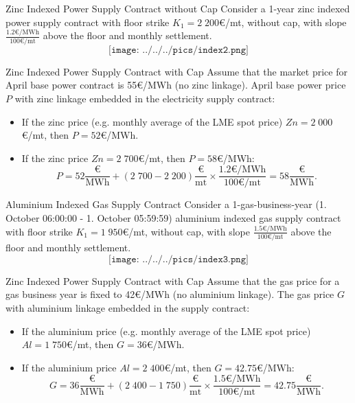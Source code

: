 {Zinc Indexed Power Supply Contract without Cap}
Consider a 1-year zinc indexed power supply contract with floor strike $K_1=2\;200$€/mt, without cap, with slope $\frac{1.2\text{€/MWh}}{100\text{€/mt}}$ above the floor and monthly settlement.
$$\texttt{[image: ../../../pics/index2.png]}$$

{Zinc Indexed Power Supply Contract with Cap}
Assume that the market price for April base power contract is \textcolor[rgb]{1.00,0.00,0.00}{55€/MWh} (no zinc linkage). April base power price $P$ with zinc linkage embedded in the electricity supply contract:
\vspace{0.4cm}
\begin{itemize}
  \item<2-> If the zinc price (e.g. monthly average of the LME spot price) $Zn=2\;000$€/mt, then \textcolor[rgb]{0.00,0.00,1.00}{$P=52$€/MWh}.
  \item<3-> If the zinc price $Zn=2\;700$€/mt, then \textcolor[rgb]{0.00,0.00,1.00}{$P=58$€/MWh}:
  $$P=52\frac{\text{€}}{\text{MWh}}+(2\;700-2\;200)\frac{\text{€}}{\text{mt}}\times\frac{1.2\text{€/MWh}}{100\text{€/mt}}=58\frac{\text{€}}{\text{MWh}}.$$
\end{itemize}

{Aluminium Indexed Gas Supply Contract}
Consider a 1-gas-business-year (1. October 06:00:00 - 1. October 05:59:59) aluminium indexed gas supply contract with floor strike $K_1=1\;950$€/mt, without cap, with slope $\frac{1.5\text{€/MWh}}{100\text{€/mt}}$ above the floor and monthly settlement.
$$\texttt{[image: ../../../pics/index3.png]}$$

{Zinc Indexed Power Supply Contract with Cap}
Assume that the gas price for a gas business year is fixed to \textcolor[rgb]{1.00,0.00,0.00}{42€/MWh} (no aluminium linkage). The gas price $G$ with aluminium linkage embedded in the supply contract:
\vspace{0.4cm}
\begin{itemize}
  \item<2-> If the aluminium price (e.g. monthly average of the LME spot price) $Al=1\;750$€/mt, then \textcolor[rgb]{0.00,0.00,1.00}{$G=36$€/MWh}.
  \item<3-> If the aluminium price $Al=2\;400$€/mt, then \textcolor[rgb]{0.00,0.00,1.00}{$G=42.75$€/MWh}:
  $$G=36\frac{\text{€}}{\text{MWh}}+(2\;400-1\;750)\frac{\text{€}}{\text{mt}}\times\frac{1.5\text{€/MWh}}{100\text{€/mt}}=42.75\frac{\text{€}}{\text{MWh}}.$$
\end{itemize}


